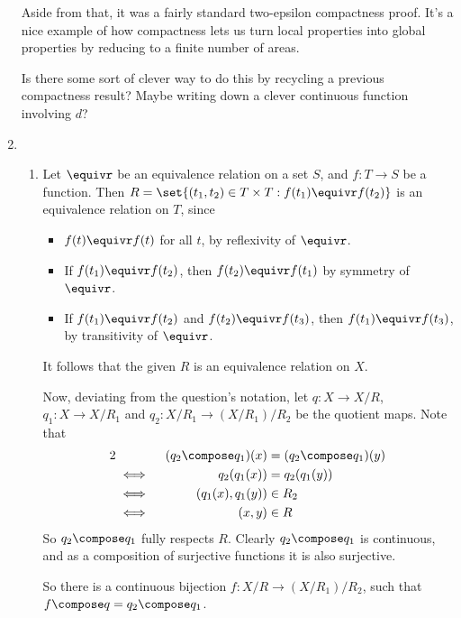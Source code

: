 \documentclass[a4paper,12pt,fleqn]{article}
\begin{document}
\begin{enumerate}[label=\arabic*.,leftmargin=*]
\begin{remark}
   Aside from that, it was a fairly standard two-epsilon compactness proof.
   It's a nice example of how compactness lets us turn local properties into
   global properties by reducing to a finite number of areas.
  \end{remark}
  \begin{question}
   Is there some sort of clever way to do this by recycling a previous
   compactness result? Maybe writing down a clever continuous function involving
   \(d\)?
  \end{question}
 \item
  \begin{enumerate}[label=(\alph*)]
   \item
    Let \(\equivr\) be an equivalence relation on a set \(S\), and \(f: T \to S\)
    be a function. Then
    \(R = \set{(t_1, t_2) \in T \times T : f(t_1) \equivr f(t_2)}\) is an
    equivalence relation on \(T\), since
    \begin{itemize}
     \item
      \(f(t) \equivr f(t)\) for all \(t\), by reflexivity of \(\equivr\).
     \item
      If \(f(t_1) \equivr f(t_2)\), then \(f(t_2) \equivr f(t_1)\) by symmetry of
      \(\equivr\).
     \item
      If \(f(t_1) \equivr f(t_2)\) and \(f(t_2) \equivr f(t_3)\),
      then \(f(t_1) \equivr f(t_3)\), by transitivity of \(\equivr\).
    \end{itemize}
    It follows that the given \(R\) is an equivalence relation on \(X\).

    Now, deviating from the question's notation, let \(q: X \to X/R\),
    \(q_1: X \to X / R_1\) and \(q_2: X / R_1 \to (X / R_1) / R_2\) be the
    quotient maps. Note that
    \begin{alignat*}2
     && (q_2 \compose q_1)(x) &{}= (q_2 \compose q_1)(y) \\
     &\iff{}& q_2(q_1(x)) &{}= q_2(q_1(y)) \\
     &\iff{}& (q_1(x), q_1(y)) &{}\in R_2 \\
     &\iff{}& (x, y) &{}\in R
    \end{alignat*}
    So \(q_2 \compose q_1\) fully respects \(R\). Clearly \(q_2 \compose q_1\) is
    continuous, and as a composition of surjective functions it is also
    surjective.

    So there is a continuous bijection \(f: X / R \to (X / R_1) / R_2\), such that
    \(f \compose q = q_2 \compose q_1\).


\end{enumerate}
\end{enumerate}
\end{document}
